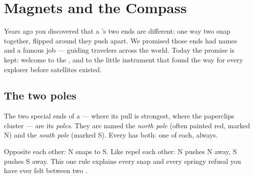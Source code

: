 \chapter{Magnets and the Compass}\label{ch:g4:magnets-and-compass}

Years ago you discovered that a 's two ends are different:
one way two  snap together, flipped around they push apart.
We promised those ends had names and a famous job --- guiding
travelers across the world. Today the promise is kept: welcome to
the , and to the little instrument that found the way for
every explorer before satellites existed.

\section{The two poles}

\begin{definition}[Poles]\label{def:g4:magnets-and-compass:poles}
The two special ends of a  --- where its pull is strongest,
where the paperclips cluster --- are its \emph{poles}.
They are named the \emph{north pole} (often
painted red, marked N) and the \emph{south pole}
(marked S). Every  has both: one of each, always.
\end{definition}

\begin{proposition}\label{prop:g4:magnets-and-compass:rule}
Opposite   each other: N snaps to S. Like  repel
each other: N pushes N away, S pushes S away. This one rule
explains every snap and every springy refusal you have ever felt
between two .
\end{proposition}

